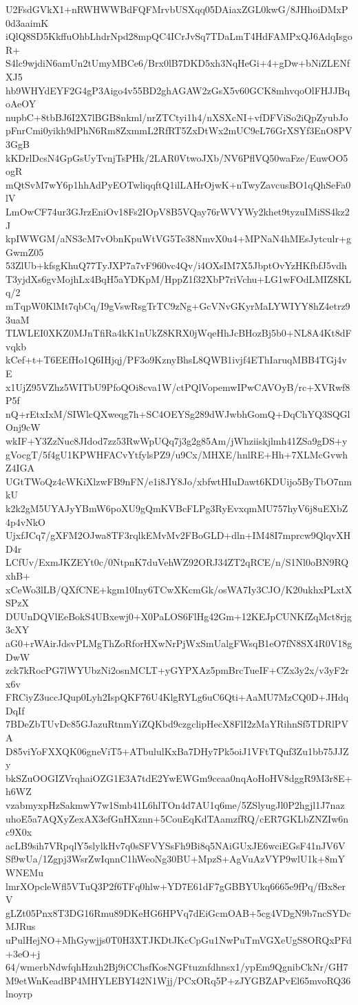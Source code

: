 U2FsdGVkX1+nRWHWWBdFQFMrvbUSXqq05DAiaxZGL0kwG/8JHhoiDMxP0d3aaimK
iQlQ8SD5KkffuOhbLhdrNpd28mpQC4ICrJvSq7TDaLmT4HdFAMPxQJ6AdqIsgoR+
S4lc9wjdiN6amUn2tUmyMBCe6/Brx0lB7DKD5xh3NqHeGi+4+gDw+bNiZLENfXJ5
hb9WHYdEYF2G4gP3Aigo4v55BD2ghAGAW2zGsX5v60GCK8mhvqoOlFHJJBqoAeOY
nupbC+8tbBJ6I2X7lBGB8nkml/nrZTCtyi1h4/nXSXcNI+vfDFViSo2iQpZyubJo
pFnrCmi0yikh9dPhN6Rm8ZxmmL2RfRT5ZxDtWx2mUC9eL76GrXSYf3EnO8PV3GgB
kKDrlDcsN4GpGsUyTvnjTsPHk/2LAR0VtwoJXb/NV6PflVQ50waFze/EuwOO5ogR
mQtSvM7wY6p1hhAdPyEOTwliqqftQ1ilLAHrOjwK+nTwyZavcusBO1qQhSeFa0lV
LmOwCF74ur3GJrzEniOv18Fs2IOpV8B5VQay76rWVYWy2khet9tyzuIMiSS4kz2J
kpIWWGM/aNS3cM7vObnKpuWtVG5Te38NmvX0u4+MPNaN4hMEsJytculr+gGwmZ05
53ZlUb+kfsgKhuQ77TyJXP7a7vF960vc4Qv/i4OXsIM7X5JbptOvYzHKfbfJ5vdh
T3yjdXs6gvMojhLx4BqH5aYDKpM/HppZ1f32XbP7riVchu+LG1wFOdLMIZ8KLq/2
mTqpW0KlMt7qbCq/I9gVswRsgTrTC9zNg+GcVNvGKyrMaLYWIYY8hZ4etrz93uaM
TLWLEI0XKZ0MJnTfiRa4kK1nUkZ8KRX0jWqeHhJcBHozBj5b0+NL8A4Kt8dFvqkb
kCef+t+T6EEfHo1Q6IHjqj/PF3o9KznyBhsL8QWB1ivjf4EThIaruqMBB4TGj4vE
x1UjZ95VZhz5WITbU9PfoQOi8cva1W/ctPQlVopemwIPwCAVOyB/rc+XVRwf8P5f
nQ+rEtxIxM/SIWlcQXweqg7h+SC4OEYSg289dWJwbhGomQ+DqChYQ3SQGlOnj9cW
wkIF+Y3ZzNuc8JIdod7zz53RwWpUQq7j3g2g85Am/jWhziiskjlmh41ZSa9gDS+y
gVocgT/5f4gU1KPWHFACvYtfylsPZ9/u9Cx/MHXE/hnlRE+Hh+7XLMcGvwhZ4IGA
UGtTWoQz4cWKiXlzwFB9nFN/e1i8JY8Jo/xbfwtHIuDawt6KDUijo5ByTbO7nmkU
k2k2gM5UYAJyYBmW6poXU9gQmKVBcFLPg3RyEvxqmMU757hyV6j8uEXbZ4p4vNkO
UjxfJCq7/gXFM2OJwa8TF3rqlkEMvMv2FBoGLD+dln+IM48I7mprcw9QlqvXHD4r
LCfUv/ExmJKZEYt0c/0NtpnK7duVehWZ92ORJ34ZT2qRCE/n/S1Nl0oBN9RQxhB+
xCeWo3lLB/QXfCNE+kgm10Iny6TCwXKcmGk/osWA7Iy3CJO/K20ukhxPLxtXSPzX
DUUnDQVlEeBokS4UBxewj0+X0PaLOS6FlHg42Gm+12KEJpCUNKfZqMct8rjg3cXY
aG0+rWAirJdsvPLMgThZoRforHXwNrPjWxSmUalgFWsqB1eO7fN8SX4R0V18gDwW
zck7kRocPG7lWYUbzNi2osnMCLT+yGYPXAz5pmBrcTueIF+CZx3y2x/v3yF2rx6v
FRCiyZ3uccJQup0Lyh2IspQKF76U4KlgRYLg6uC6Qti+AaMU7MzCQ0D+JHdqDqIf
7BDeZbTUvDc85GJazuRtnmYiZQKbd9czgclipHecX8FlI2zMaYRihnSf5TDRlPVA
D85viYoFXXQK06gneViT5+ATbululKxBa7DHy7Pk5oiJ1VFtTQuf3Zu1bb75JJZy
bkSZuOOGIZVrqhaiOZG1E3A7tdE2YwEWGm9ccaa0nqAoHoHV8dggR9M3r8E+h6WZ
vzabmyxpHzSakmwY7w1Smb41L6hlTOn4d7AU1q6me/5ZSlyugJl0P2hgjl1J7naz
uhoE5a7AQXyZexAX3efGnHXznn+5CouEqKdTAamzfRQ/cER7GKLbZNZIw6nc9X0x
acLB9sih7VRpqlY5slylkHv7q0sSFVYSsFh9Bi8q5NAiGUxJE6wciEGsF41nJV6V
Sf9wUa/1Zgpj3WsrZwIqnnC1hWeoNg30BU+MpzS+AgVuAzVYP9wlU1k+8mYWNEMu
lmrXOpcleWfl5VTuQ3P2f6TFq0hlw+YD7E61dF7gGBBYUkq6665e9fPq/fBx8erV
gLZt05Pnx8T3DG16Rmu89DKeHG6HPVq7dEiGcmOAB+5cg4VDgN9b7ncSYDcMJRus
uPulHejNO+MhGywjjs0T0H3XTJKDtJKcCpGu1NwPuTmVGXeUgS8ORQxPFd+3eO+j
64/wmerbNdwfqhHzuh2Bj9iCChsfKosNGFtuznfdhnsx1/ypEm9QgnibCkNr/GH7
M9etWnKeadBP4MHYLEBYI42N1Wjj/PCxORq5P+zJYGBZAPvEl65mvoRQ36lnoyrp
